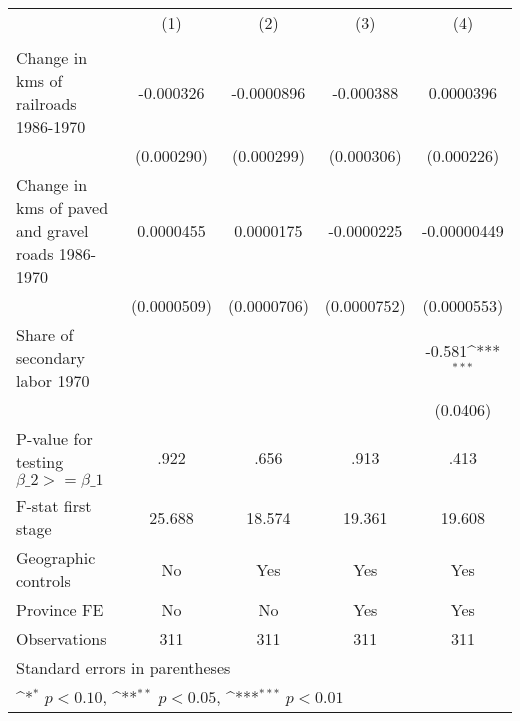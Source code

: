 {
\def\sym#1{\ifmmode^{#1}\else\(^{#1}\)\fi}
\begin{tabular}{l*{4}{c}}
\hline\hline
                &\multicolumn{1}{c}{(1)}&\multicolumn{1}{c}{(2)}&\multicolumn{1}{c}{(3)}&\multicolumn{1}{c}{(4)}\\
                &\multicolumn{1}{c}{}&\multicolumn{1}{c}{}&\multicolumn{1}{c}{}&\multicolumn{1}{c}{}\\
\hline
Change in kms of railroads 1986-1970&-0.000326         &-0.0000896         &-0.000388         &0.0000396         \\
                &(0.000290)         &(0.000299)         &(0.000306)         &(0.000226)         \\
[1em]
Change in kms of paved and gravel roads 1986-1970&0.0000455         &0.0000175         &-0.0000225         &-0.00000449         \\
                &(0.0000509)         &(0.0000706)         &(0.0000752)         &(0.0000553)         \\
[1em]
Share of secondary labor 1970&                  &                  &                  &   -0.581\sym{***}\\
                &                  &                  &                  & (0.0406)         \\
\hline
P-value for testing $\beta\_{2} >= \beta\_{1}$&     .922         &     .656         &     .913         &     .413         \\
F-stat first stage&   25.688         &   18.574         &   19.361         &   19.608         \\
Geographic controls&       No         &      Yes         &      Yes         &      Yes         \\
Province FE     &       No         &       No         &      Yes         &      Yes         \\
Observations    &      311         &      311         &      311         &      311         \\
\hline\hline
\multicolumn{5}{l}{\footnotesize Standard errors in parentheses}\\
\multicolumn{5}{l}{\footnotesize \sym{*} \(p<0.10\), \sym{**} \(p<0.05\), \sym{***} \(p<0.01\)}\\
\end{tabular}
}
